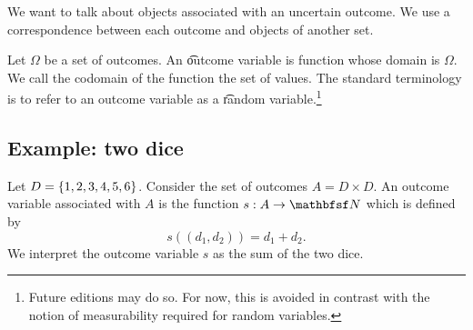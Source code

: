 

We want to talk about objects associated with an uncertain outcome.
We use a correspondence between each outcome and objects of another set.


Let $\Omega$ be a set of outcomes.
An \t{outcome variable} is function whose domain is $\Omega$.
We call the codomain of the function the set of values.
The standard terminology is to refer to an outcome variable as a \t{random variable}.\footnote{Future editions may do so. For now, this is avoided in contrast with the notion of measurability required for random variables.}

\subsection{Example: two dice}

Let $D = \{1, 2, 3, 4, 5, 6\}$.
Consider the set of outcomes $A = D \times D$.
An outcome variable associated with $A$ is the function $s: A \to \N$ which is defined by
\[
  s((d_1, d_2)) = d_1 + d_2.
\]
We interpret the outcome variable $s$ as the sum of the two dice.

\blankpage
